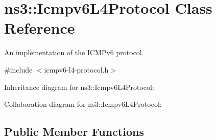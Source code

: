 \hypertarget{classns3_1_1Icmpv6L4Protocol}{}\section{ns3\+:\+:Icmpv6\+L4\+Protocol Class Reference}
\label{classns3_1_1Icmpv6L4Protocol}


An implementation of the I\+C\+M\+Pv6 protocol.  




{\ttfamily \#include $<$icmpv6-\/l4-\/protocol.\+h$>$}



Inheritance diagram for ns3\+:\+:Icmpv6\+L4\+Protocol\+:


Collaboration diagram for ns3\+:\+:Icmpv6\+L4\+Protocol\+:
\subsection*{Public Member Functions}
